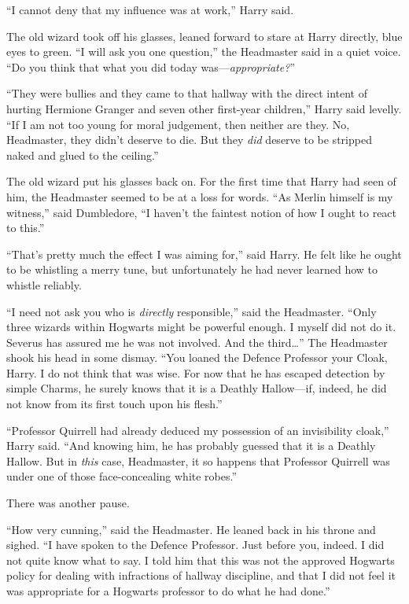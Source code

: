 “I cannot deny that my influence was at work,” Harry said.

The old wizard took off his glasses, leaned forward to stare at Harry directly, blue eyes to green. “I will ask you one question,” the Headmaster said in a quiet voice. “Do you think that what you did today was—\emph{appropriate?}”

“They were bullies and they came to that hallway with the direct intent of hurting Hermione Granger and seven other first-year children,” Harry said levelly. “If I am not too young for moral judgement, then neither are they. No, Headmaster, they didn’t deserve to die. But they \emph{did} deserve to be stripped naked and glued to the ceiling.”

The old wizard put his glasses back on. For the first time that Harry had seen of him, the Headmaster seemed to be at a loss for words. “As Merlin himself is my witness,” said Dumbledore, “I haven’t the faintest notion of how I ought to react to this.”

“That’s pretty much the effect I was aiming for,” said Harry. He felt like he ought to be whistling a merry tune, but unfortunately he had never learned how to whistle reliably.

“I need not ask you who is \emph{directly} responsible,” said the Headmaster. “Only three wizards within Hogwarts might be powerful enough. I myself did not do it. Severus has assured me he was not involved. And the third…” The Headmaster shook his head in some dismay. “You loaned the Defence Professor your Cloak, Harry. I do not think that was wise. For now that he has escaped detection by simple Charms, he surely knows that it is a Deathly Hallow—if, indeed, he did not know from its first touch upon his flesh.”

“Professor Quirrell had already deduced my possession of an invisibility cloak,” Harry said. “And knowing him, he has probably guessed that it is a Deathly Hallow. But in \emph{this} case, Headmaster, it so happens that Professor Quirrell was under one of those face-concealing white robes.”

There was another pause.

“How very cunning,” said the Headmaster. He leaned back in his throne and sighed. “I have spoken to the Defence Professor. Just before you, indeed. I did not quite know what to say. I told him that this was not the approved Hogwarts policy for dealing with infractions of hallway discipline, and that I did not feel it was appropriate for a Hogwarts professor to do what he had done.”

